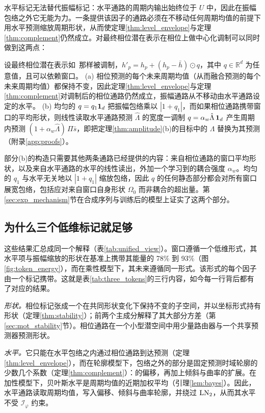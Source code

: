 {
水平标记无法替代振幅标记：水平通路的周期内输出始终位于 $U$ 中，因此在振幅包络之外它无能为力。一条提供该因子的通路必须在不移动任何周期均值的前提下用水平预测缩放周期形状，从而使定理\ref{thm:level_envelope}与定理\ref{thm:complement}仍然成立。对最终相位潜在表示在相位上做中心化调制可以同时做到这两点：

\begin{proposition}[中心化调制]
\label{prop:modulation}
设最终相位潜在表示如~那样被调制，$h'_p=h_p+(h_p-\bar h)\odot q$，其中 $q\in\mathbb R^d$ 为任意值，且可以依赖窗口。
(a) 相位预测的每个未来周期均值（从而融合预测的每个未来周期均值）都保持不变，因此定理\ref{thm:level_envelope}与定理\ref{thm:complement}对调制后的相位通路仍然成立，振幅通路从不移动由水平通路设定的水平。
(b) 均匀的 $q=q_1\mathbf 1_d$ 把振幅包络乘以 $|1+q_1|$，而如果相位通路携带窗口的平均形状，则线性读取水平通路预测 $\hat\Lambda$ 的宽度一调制 $q=\alpha_w\hat\Lambda\,\mathbf 1_d$ 产生周期内预测 $(1+\alpha_w\hat\Lambda)\,\Pi\bar s$，即把定理\ref{thm:amplitude}(b)的目标中的 $\Lambda$ 替换为其预测（附录\ref{app:proofs}）。
\end{proposition}

部分(b)的构造只需要其他两条通路已经提供的内容：来自相位通路的窗口平均形状，以及来自水平通路的水平的线性读出，外加一个学习到的耦合强度 $\alpha_w$。均匀的 $q_1$ 与水平无关地以 $|1+q_1|$ 缩放包络，因此 $q$ 的任何静态部分都会对所有窗口展宽包络，包括应对来自窗口自身形状 $\Omega_0$ 而非耦合的超出量。第\ref{sec:exp_mechanism}节在合成序列与训练后的模型上证实了这两个部分。

\subsection{为什么三个低维标记就足够}
\label{sec:theory_design}

这些结果汇总成同一个解释（表\ref{tab:unified_view}）。窗口遵循一个低维形式，其水平项与振幅缩放的形状在基准上携带其能量的 78\% 到 93\%（图\ref{fig:token_energy}），而在乘性模型下，其未来遵循同一形式。该形式的每个因子由一个标记携带。这就是表\ref{tab:three_tokens}的三行内容，如今每一行背后都有了对应的结果。

\emph{形状。}相位标记张成一个在共同形状变化下保持不变的子空间，并以坐标形式持有形状（定理\ref{thm:stability}）；前两个主成分解释了其大部分方差（第\ref{sec:mot_stability}节）。相位通路在一个小型潜空间中用少量路由器与一个共享预测器预测形状。

\emph{水平。}它只能在水平包络之内通过相位通路到达预测（定理\ref{thm:level_envelope}），而在轮廓模型下，包络之外的部分是固定预测时域轮廓的少数几个系数（定理\ref{thm:complement}）：的偏移，再加上倾斜与曲率的扩展。在加性模型下，贝叶斯水平是周期均值的近期加权平均（引理\ref{lem:bayes}）。因此，水平通路读取周期均值，写入偏移、倾斜与曲率轮廓，并绕过 $\operatorname{LN}_2$，从而其水平不受 $\mathcal I_\varphi$ 约束。

}
